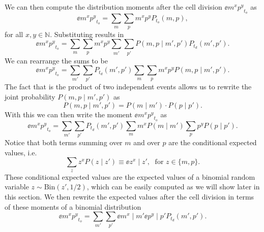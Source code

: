 We can then compute the distribution moments after the cell division $\ee{m^x
p^y}_{t_o}$ as
\begin{equation}
\ee{m^x p^y}_{t_o} = \sum_m \sum_p m^x p^y P_{t_o}(m, p),
\end{equation}
for all $x, y \in \mathbb{N}$. Substituting  results in
\begin{equation}
\ee{m^x p^y}_{t_o} = \sum_m \sum_p m^x p^y
\sum_{m'} \sum_{p'} P(m, p \mid m', p') P_{t_d}(m', p').
\end{equation}
We can rearrange the sums to be 
\begin{equation}
\ee{m^x p^y}_{t_o} = \sum_{m'} \sum_{p'} P_{t_d}(m', p')
                     \sum_m \sum_p m^x p^y P(m, p \mid m', p').
\end{equation}
The fact that  is the product of two independent events
allows us to rewrite the joint probability $P(m, p \mid m', p')$ as
\begin{equation}
P(m, p \mid m', p') = P(m \mid m') \cdot P(p \mid p').
\end{equation}
With this we can then write the moment $\ee{m^x p^y}_{t_o}$ as
\begin{equation}
\ee{m^x p^y}_{t_o} = \sum_{m'} \sum_{p'} P_{t_d}(m', p')
                     \sum_m  m^x  P(m \mid m')
                     \sum_p p^y P(p \mid p').
\end{equation}
Notice that both terms summing over $m$ and over $p$ are the conditional
expected values, i.e.
\begin{equation}
\sum_z  z^x  P(z \mid z') \equiv \ee{z^x \mid z'}, \; 
{\text{ for } z\in \{m, p \}}.
\end{equation}
These conditional expected values are the expected values of a binomial random
variable $z \sim \text{Bin}(z', 1/2)$, which can be easily computed as we will
show later in this section. We then rewrite the expected values after the cell
division in terms of these moments of a binomial distribution
\begin{equation}
\ee{m^x p^y}_{t_o} = \sum_{m'} \sum_{p'} \ee{m^x \mid m'} \ee{p^y \mid p'} 
                     P_{t_d}(m', p').
  \label{eq_general_binom_mom}
\end{equation}

